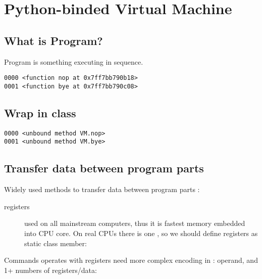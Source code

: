 \chapter{Python-binded Virtual Machine}
\clearpage

\section{What is Program?}

Program is something executing in sequence.


\begin{lstlisting}
0000 <function nop at 0x7ff7bb790b18>
0001 <function bye at 0x7ff7bb790c08>
\end{lstlisting}

\section{Wrap in class}


\begin{lstlisting}
0000 <unbound method VM.nop>
0001 <unbound method VM.bye>
\end{lstlisting}

\section{Transfer data between program parts}

Widely used methods to transfer data between program parts :
\begin{description}
\item[registers] used on all mainstream computers, thus it is fastest memory
embedded into CPU core. On real CPUs there is one
\href{https://en.wikipedia.org/wiki/Register_file}{}, so we
should define registers as static class member:
\end{description}



Commands operates with registers need more complex encoding in : operand, and 1+ numbers of registers/data:

